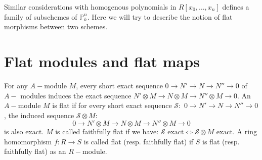 \documentclass[12pt]{article}
\theoremstyle{mytheoremstyle}
\newcommand{\bP}{\mathbb{P}}
\begin{document}
\vspace*{2mm}
\hspace*{8mm}
Similar considerations with homogenous polynomials in $R[x_0,\ldots,x_n]$
defines a family of subschemes of $\bP^n_k$.
Here we will try to describe the notion of flat morphisms
between two schemes.

\section{Flat modules and flat maps}

\hspace*{8mm}For any $A-$module $M$, every short exact sequence
$0\longrightarrow N'\longrightarrow N\longrightarrow N''
\longrightarrow 0$ of $A-$ modules induces the exact sequence
$ N'\otimes M\longrightarrow N\otimes M
\longrightarrow N''\otimes M\longrightarrow 0$.
An $A-$module $M$ is flat if for every short exact sequence
$\mathcal{S}:$
$0\longrightarrow N'\longrightarrow N\longrightarrow N''
\longrightarrow 0$, the induced sequence $\mathcal{S}\otimes M:$ 
$$0\longrightarrow N'\otimes M\longrightarrow N\otimes M
\longrightarrow N''\otimes M\longrightarrow 0$$
is also exact. $M$ is called faithfully flat if we have:
$\mathcal{S}\text{ exact}\iff \mathcal{S}\otimes M \text{ exact}.$
A ring homomorphism $f:R \to S$ is called flat (resp. faithfully flat)
if $S$ is flat (resp. faithfully flat) as
an $R-$module.
\end{document}
